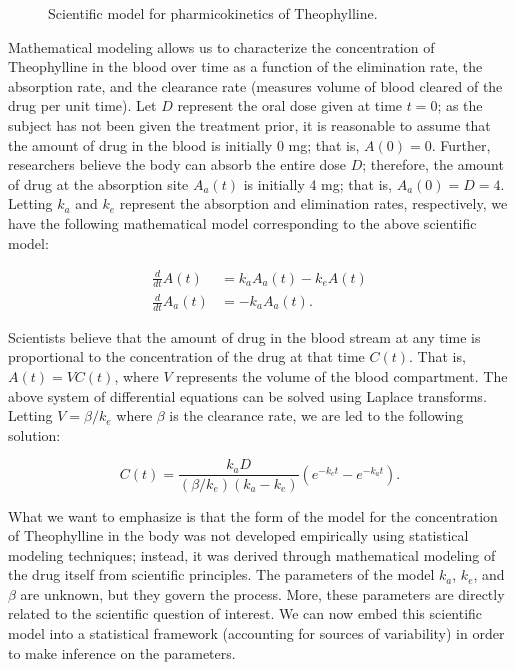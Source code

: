 \documentclass[
  letterpaper,
  DIV=11,
  numbers=noendperiod]{scrreprt}
\theoremstyle{definition}
\theoremstyle{definition}
\theoremstyle{remark}
\begin{document}
\begin{tcolorbox}
\begin{figure}[H]
{}

\caption{\label{fig-nlm-theoph-model}Scientific model for
pharmicokinetics of Theophylline.}

\end{figure}

Mathematical modeling allows us to characterize the concentration of
Theophylline in the blood over time as a function of the elimination
rate, the absorption rate, and the clearance rate (measures volume of
blood cleared of the drug per unit time). Let \(D\) represent the oral
dose given at time \(t = 0\); as the subject has not been given the
treatment prior, it is reasonable to assume that the amount of drug in
the blood is initially 0 mg; that is, \(A(0) = 0\). Further, researchers
believe the body can absorb the entire dose \(D\); therefore, the amount
of drug at the absorption site \(A_a(t)\) is initially 4 mg; that is,
\(A_a(0) = D = 4\). Letting \(k_a\) and \(k_e\) represent the absorption
and elimination rates, respectively, we have the following mathematical
model corresponding to the above scientific model:

\[
\begin{aligned}
  \frac{d}{dt} A(t) &= k_a A_a(t) - k_e A(t) \\
  \frac{d}{dt} A_a(t) &= -k_a A_a(t).
\end{aligned}
\]

Scientists believe that the amount of drug in the blood stream at any
time is proportional to the concentration of the drug at that time
\(C(t)\). That is, \(A(t) = V C(t)\), where \(V\) represents the volume
of the blood compartment. The above system of differential equations can
be solved using Laplace transforms. Letting \(V = \beta/k_e\) where
\(\beta\) is the clearance rate, we are led to the following solution:

\[C(t) = \frac{k_a D}{\left(\beta/k_e\right)\left(k_a - k_e\right)} \left(e^{-k_e t} - e^{-k_a t}\right).\]

\end{tcolorbox}

What we want to emphasize is that the form of the model for the
concentration of Theophylline in the body was not developed empirically
using statistical modeling techniques; instead, it was derived through
mathematical modeling of the drug itself from scientific principles. The
parameters of the model \(k_a\), \(k_e\), and \(\beta\) are unknown, but
they govern the process. More, these parameters are directly related to
the scientific question of interest. We can now embed this scientific
model into a statistical framework (accounting for sources of
variability) in order to make inference on the parameters.
\end{document}
